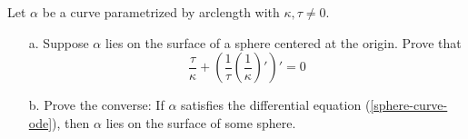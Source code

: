 \documentclass[Shifrin_Solutions_Spring_2018]{subfiles}
\begin{document}
\clearpage



\begin{exercise}
Let $\alpha$ be a curve parametrized by arclength with $\kappa,\tau \neq 0$.
\begin{itemize}
\item[a.] Suppose $\alpha$ lies on the surface of a sphere centered at the origin. Prove that
\begin{equation}\label{sphere-curve-ode}
\dfrac{\tau}{\kappa} + \left(\dfrac{1}{\tau} \left(\dfrac{1}{\kappa}\right)' \right)' =0
\end{equation}

\item[b.] Prove the converse: If $\alpha$ satisfies the differential equation 
(\ref{sphere-curve-ode}), then $\alpha$ lies on the surface of some sphere.
\end{itemize}
\end{exercise}
\end{document}
